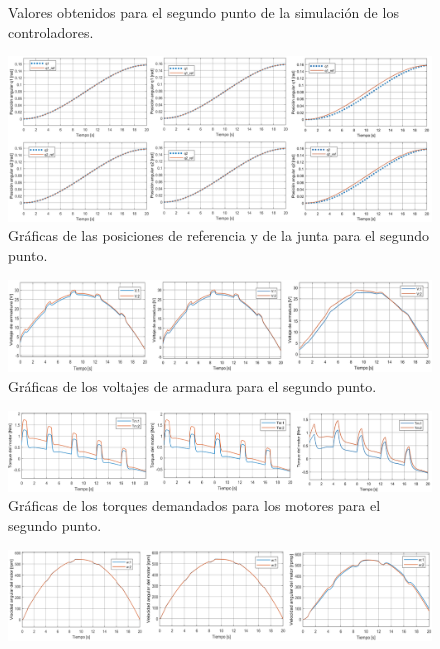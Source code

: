 \begin{itemize}
\begin{figure}[H]
    	\caption{Valores obtenidos para el segundo punto de la simulación de los controladores.}
    	\label{fig:control10}
    \end{figure}
    \begin{figure}[H]
    	\centering
    	\includegraphics[width=\columnwidth]{imagenes/control11}
    	\caption{Gráficas de las posiciones de referencia y de la junta para el segundo punto.}
    	\label{fig:control11}
    \end{figure}
    \begin{figure}[H]
    	\centering
    	\includegraphics[width=\columnwidth]{imagenes/control12}
    	\caption{Gráficas de los voltajes de armadura para el segundo punto.}
    	\label{fig:control12}
    \end{figure}
    \begin{figure}[H]
    	\centering
    	\includegraphics[width=\columnwidth]{imagenes/control13}
    	\caption{Gráficas de los torques demandados para los motores para el segundo punto.}
    	\label{fig:control13}
    \end{figure}
    \begin{figure}[H]
    	\centering
    	\includegraphics[width=\columnwidth]{imagenes/control14}

\end{figure}
\end{itemize}

